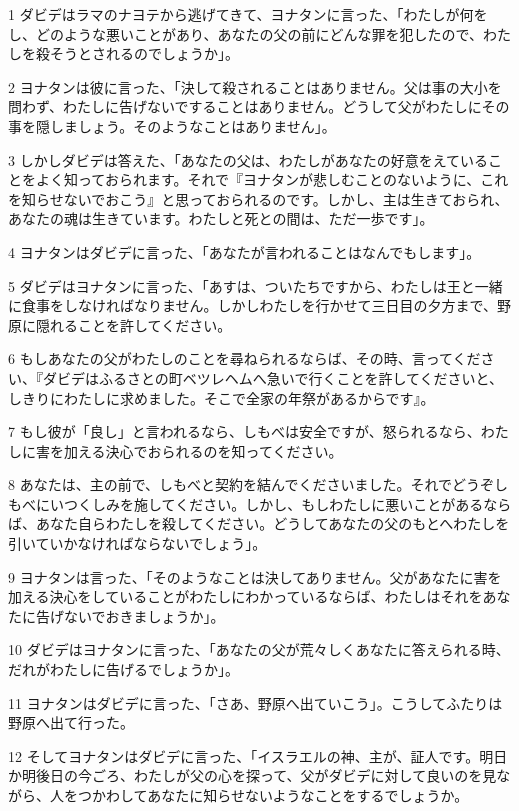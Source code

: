 \par 1 ダビデはラマのナヨテから逃げてきて、ヨナタンに言った、「わたしが何をし、どのような悪いことがあり、あなたの父の前にどんな罪を犯したので、わたしを殺そうとされるのでしょうか」。
\par 2 ヨナタンは彼に言った、「決して殺されることはありません。父は事の大小を問わず、わたしに告げないですることはありません。どうして父がわたしにその事を隠しましょう。そのようなことはありません」。
\par 3 しかしダビデは答えた、「あなたの父は、わたしがあなたの好意をえていることをよく知っておられます。それで『ヨナタンが悲しむことのないように、これを知らせないでおこう』と思っておられるのです。しかし、主は生きておられ、あなたの魂は生きています。わたしと死との間は、ただ一歩です」。
\par 4 ヨナタンはダビデに言った、「あなたが言われることはなんでもします」。
\par 5 ダビデはヨナタンに言った、「あすは、ついたちですから、わたしは王と一緒に食事をしなければなりません。しかしわたしを行かせて三日目の夕方まで、野原に隠れることを許してください。
\par 6 もしあなたの父がわたしのことを尋ねられるならば、その時、言ってください、『ダビデはふるさとの町ベツレヘムへ急いで行くことを許してくださいと、しきりにわたしに求めました。そこで全家の年祭があるからです』。
\par 7 もし彼が「良し」と言われるなら、しもべは安全ですが、怒られるなら、わたしに害を加える決心でおられるのを知ってください。
\par 8 あなたは、主の前で、しもべと契約を結んでくださいました。それでどうぞしもべにいつくしみを施してください。しかし、もしわたしに悪いことがあるならば、あなた自らわたしを殺してください。どうしてあなたの父のもとへわたしを引いていかなければならないでしょう」。
\par 9 ヨナタンは言った、「そのようなことは決してありません。父があなたに害を加える決心をしていることがわたしにわかっているならば、わたしはそれをあなたに告げないでおきましょうか」。
\par 10 ダビデはヨナタンに言った、「あなたの父が荒々しくあなたに答えられる時、だれがわたしに告げるでしょうか」。
\par 11 ヨナタンはダビデに言った、「さあ、野原へ出ていこう」。こうしてふたりは野原へ出て行った。
\par 12 そしてヨナタンはダビデに言った、「イスラエルの神、主が、証人です。明日か明後日の今ごろ、わたしが父の心を探って、父がダビデに対して良いのを見ながら、人をつかわしてあなたに知らせないようなことをするでしょうか。
